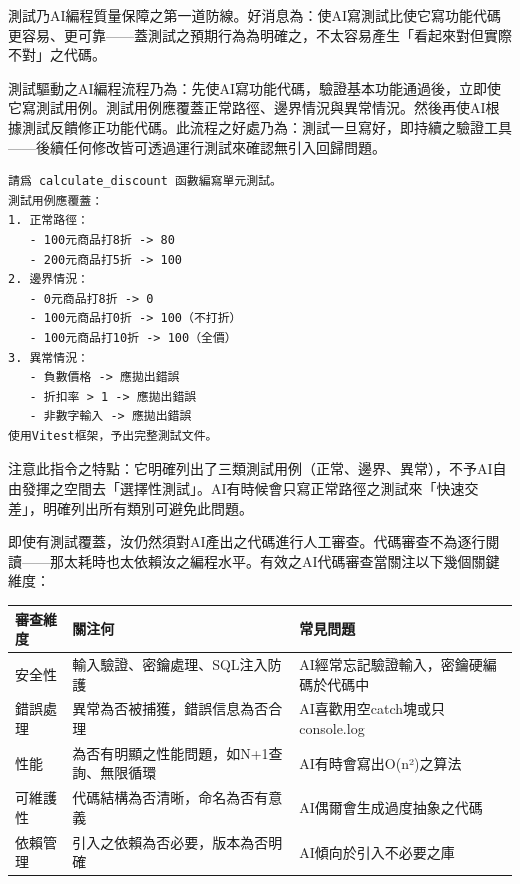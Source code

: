 


測試乃AI編程質量保障之第一道防線。好消息為：使AI寫測試比使它寫功能代碼更容易、更可靠——蓋測試之預期行為為明確之，不太容易產生「看起來對但實際不對」之代碼。

測試驅動之AI編程流程乃為：先使AI寫功能代碼，驗證基本功能通過後，立即使它寫測試用例。測試用例應覆蓋正常路徑、邊界情況與異常情況。然後再使AI根據測試反饋修正功能代碼。此流程之好處乃為：測試一旦寫好，即持續之驗證工具——後續任何修改皆可透過運行測試來確認無引入回歸問題。

\begin{lstlisting}
請爲 calculate_discount 函數編寫單元測試。
測試用例應覆蓋：
1. 正常路徑：
   - 100元商品打8折 -> 80
   - 200元商品打5折 -> 100
2. 邊界情況：
   - 0元商品打8折 -> 0
   - 100元商品打0折 -> 100（不打折）
   - 100元商品打10折 -> 100（全價）
3. 異常情況：
   - 負數價格 -> 應拋出錯誤
   - 折扣率 > 1 -> 應拋出錯誤
   - 非數字輸入 -> 應拋出錯誤
使用Vitest框架，予出完整測試文件。
\end{lstlisting}

注意此指令之特點：它明確列出了三類測試用例（正常、邊界、異常），不予AI自由發揮之空間去「選擇性測試」。AI有時候會只寫正常路徑之測試來「快速交差」，明確列出所有類別可避免此問題。


即使有測試覆蓋，汝仍然須對AI產出之代碼進行人工審查。代碼審查不為逐行閱讀——那太耗時也太依賴汝之編程水平。有效之AI代碼審查當關注以下幾個關鍵維度：

\begin{center}
\begin{tabularx}{\linewidth}{|X|X|X|}
\hline
\textbf{審查維度} & \textbf{關注何} & \textbf{常見問題} \tabularnewline
\hline
安全性 & 輸入驗證、密鑰處理、SQL注入防護 & AI經常忘記驗證輸入，密鑰硬編碼於代碼中 \tabularnewline
錯誤處理 & 異常為否被捕獲，錯誤信息為否合理 & AI喜歡用空catch塊或只console.log \tabularnewline
性能 & 為否有明顯之性能問題，如N+1查詢、無限循環 & AI有時會寫出O(n²)之算法 \tabularnewline
可維護性 & 代碼結構為否清晰，命名為否有意義 & AI偶爾會生成過度抽象之代碼 \tabularnewline
依賴管理 & 引入之依賴為否必要，版本為否明確 & AI傾向於引入不必要之庫 \tabularnewline
\hline
\end{tabularx}
\end{center}


